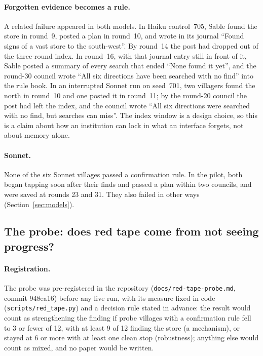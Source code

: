 \documentclass[11pt]{article}
\begin{document}
\paragraph{Forgotten evidence becomes a rule.} A related failure appeared in both models. In Haiku
control~705, Sable found the store in round~9, posted a plan in round~10, and wrote in its journal
``Found signs of a vast store to the south-west''. By round~14 the post had dropped out of the
three-round index. In round~16, with that journal entry still in front of it, Sable posted a summary
of every search that ended ``None found it yet'', and the round-30 council wrote ``All six directions
have been searched with no find'' into the rule book. In an interrupted Sonnet run on seed~701, two
villagers found the north in round~10 and one posted it in round~11; by the round-20 council the post
had left the index, and the council wrote ``All six directions were searched with no find, but
searches can miss''. The index window is a design choice, so this is a claim about how an
institution can lock in what an interface forgets, not about memory alone.

\paragraph{Sonnet.} None of the six Sonnet villages passed a confirmation rule. In the pilot, both
began tapping soon after their finds and passed a plan within two councils, and were saved at rounds
23 and 31. They also failed in other ways (Section~\ref{sec:models}).

\subsection{The probe: does red tape come from not seeing progress?}\label{sec:probe}

\paragraph{Registration.} The probe was pre-registered in the repository (\texttt{docs/red-tape-probe.md},
commit 948ea16) before any live run, with its measure fixed in code (\texttt{scripts/red\_tape.py}) and a
decision rule stated in advance: the result would count as strengthening the finding if probe villages
with a confirmation rule fell to 3 or fewer of 12, with at least 9 of 12 finding the store (a
mechanism), or stayed at 6 or more with at least one clean stop (robustness); anything else would count
as mixed, and no paper would be written.
\end{document}
